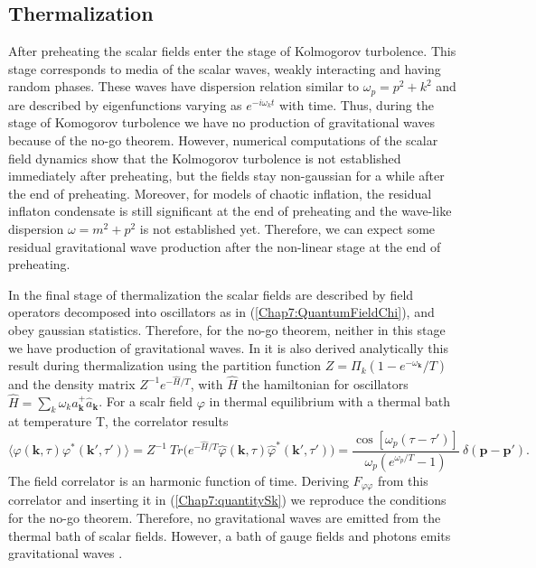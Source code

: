 \documentclass[11pt,a4paper,twoside]{book}
\begin{document}
\subsection{Thermalization}
After preheating the scalar fields enter the stage of Kolmogorov turbolence. This stage corresponds to media of the scalar waves, weakly interacting and having random phases. These waves have dispersion relation similar to $ \omega_{p}=p^{2}+k^{2} $ and are described by eigenfunctions varying as $ e^{-i\omega_{k} t} $ with time. Thus, during the stage of Komogorov turbolence we have no production of gravitational waves because of the no-go theorem. However, numerical computations of the scalar field dynamics show that the Kolmogorov turbolence is not established immediately after preheating, but the fields stay non-gaussian for a while after the end of preheating. Moreover, for models of chaotic inflation, the residual inflaton condensate is still significant at the end of preheating and the wave-like dispersion  $ \omega=m^{2}+p^{2} $ is not established yet. Therefore, we can expect some residual gravitational wave production after the non-linear stage at the end of preheating.

In the final stage of thermalization the scalar fields are described by  field operators decomposed into oscillators as in (\ref{Chap7:QuantumFieldChi}), and obey gaussian statistics. Therefore, for the no-go theorem, neither in this stage we have production of gravitational waves. In \cite{Chap7:GreenMethod} it is also derived analytically this result during thermalization using the partition function $ Z=\Pi_{k}(1-e^{-\omega_{\textbf{k}}}/T) $ and the density matrix $ Z^{-1}e^{-\hat{H}/T} $, with $ \hat{H} $ the hamiltonian for oscillators $ \hat{H}=\sum_{k}\omega_{k} a^{+}_{\textbf{k}} \hat{a}_{\textbf{k}} $. For a scalr field $\varphi$ in thermal equilibrium with a thermal bath at temperature T, the correlator results \cite{Chap7:GreenMethod}
\begin{equation}
\label{Chap7:Correlatorthermalization}
\langle \varphi(\textbf{k},\tau)\varphi^{*}(\textbf{k}',\tau')\rangle  = Z^{-1}\ Tr\Bigg(e^{-\hat{H}/T}\hat{\varphi}(\textbf{k},\tau)\hat{\varphi}^*(\textbf{k}',\tau')\Bigg) = \frac{\cos[\omega_{p}(\tau-\tau')]}{\omega_{p}(e^{\omega_{p}/T}-1)}\ \delta(\textbf{p}-\textbf{p}').
\end{equation}
The field correlator is an harmonic function of time. Deriving $ F_{\varphi\varphi} $ from this correlator and inserting it in (\ref{Chap7:quantitySk}) we reproduce the conditions for the no-go theorem.
 Therefore, no gravitational waves are emitted from the thermal bath of scalar fields. However, a bath of gauge fields and photons emits gravitational waves \cite{Chap7:EmissionBathPhotonsGaugeField}.
 
\end{document}
